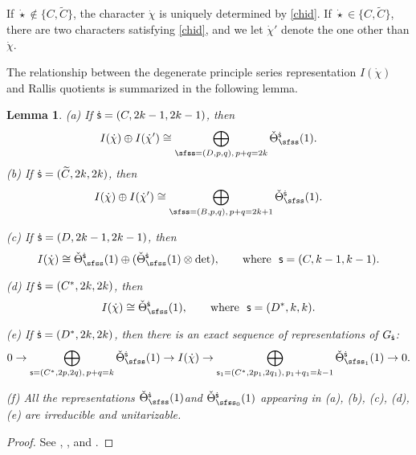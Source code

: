 \documentclass[12pt,a4paper]{amsart}
\numberwithin{equation}{section}
\newtheorem{lem}[thm]{Lemma}
\theoremstyle{remark}
\begin{document}
If  $\dot \star\notin \{C, \widetilde C\}$, the character   $\dot{\chi}$ is uniquely determined by \eqref{chid}. 
If  $\dot \star\in \{C, \widetilde C\}$, there are two characters satisfying \eqref{chid}, and we let $\dot \chi'$ denote the one other than $\dot \chi$. 


The relationship between the degenerate principle series representation $I(\dot{\chi})$ and
Rallis quotients is summarized in the following lemma.
\begin{lem}\label{degens}%
\noindent 
(a) If ${\dot{\mathsf s}}=(C,2k-1, 2k-1)$,  then
\[
  I(\dot{\chi}) \oplus I(\dot \chi')\cong \bigoplus_{\sfss=(D,p,q), \, p+q=2k}   
   \check \Theta_{\sfss}^{\dsfss}(1).
\]
\noindent 
(b) If ${\dot{\mathsf s}}=(\widetilde C,2k,2k)$,  then
\[
   I(\dot{\chi}) \oplus I(\dot \chi')\cong \bigoplus_{\sfss=(B,p,q), \, p+q=2k+1}   \check \Theta_{\sfss}^{\dsfss}(1).
\]

\noindent 
(c) If ${\dot{\mathsf s}}=(D,2k-1,2k-1)$, then
\[
  I(\dot{\chi})\cong \check \Theta_{\sfss}^{\dsfss}(1)\oplus  (\check \Theta_{\sfss}^{\dsfss}(1)\otimes \det),\qquad \textrm{where } \ \mathsf s=(C, k-1, k-1).
\]


\noindent 
(d) If ${\dot{\mathsf s}}=(C^*,2k,2k)$, then
\[
  I(\dot{\chi})\cong \check \Theta_{\sfss}^{\dsfss}(1),\qquad \textrm{where }\ \mathsf s=(D^*, k, k).
\]


\noindent 
(e) If ${\dot{\mathsf s}}=(D^*,2k,2k)$, then there is an exact sequence of representations of $G_{{\dot{\mathsf s}}}$: 
\[
0\rightarrow \bigoplus_{\mathsf s=(C^*, 2p, 2q), \, p+q=k} \check \Theta_{\sfss}^{\dsfss}(1) \rightarrow 
 I(\dot{\chi})\rightarrow  \bigoplus_{\mathsf s_1=(C^*, 2p_1, 2q_1), \, p_1+q_1=k-1} \check \Theta_{\sfss_1}^{\dsfss}(1) \rightarrow 0.
\]

\noindent 
(f) All the representations $ \check \Theta_{\sfss}^{\dsfss}(1) $and $ \check \Theta_{\sfss_0}^{\dsfss}(1)$ appearing in (a), (b), (c), (d), (e) are irreducible and unitarizable.  


\end{lem}
\begin{proof}
 See \cite[Theorem 2.4]{Ku}, \cite[Introduction]{LZ1}, \cite[Theorem 6.1]{LZ2} and  \cite[Sections 9 and 10]{Ya}.
\end{proof}
\end{document}
